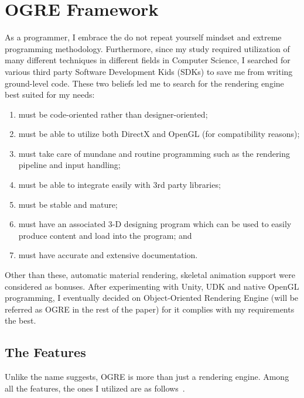\appendix
\chapter{OGRE Framework}
\label{appendix_ogre_framework}

As a programmer, I embrace the do not repeat yourself mindset and extreme programming methodology. Furthermore, since my study required utilization of many different techniques in different fields in Computer Science, I searched for various third party Software Development Kids (SDKs) to save me from writing ground-level code. These two beliefs led me to search for the rendering engine best suited for my needs:

\begin{enumerate}
\item must be code-oriented rather than designer-oriented;
\item must be able to utilize both DirectX and OpenGL (for compatibility reasons);
\item must take care of mundane and routine programming such as the rendering pipeline and input handling;
\item must be able to integrate easily with 3rd party libraries;
\item must be stable and mature;
\item must have an associated 3-D designing program which can be used to easily produce content and load into the program; and
\item must have accurate and extensive documentation.
\end{enumerate}

Other than these, automatic material rendering, skeletal animation support were considered as bonuses.
After experimenting with Unity, UDK and native OpenGL programming, I eventually decided on Object-Oriented Rendering Engine (will be referred as OGRE in the rest of the paper) for it complies with my requirements the best.


\section{The Features}
Unlike the name suggests, OGRE is more than just a rendering engine. Among all the features, the ones I utilized are as follows~\cite{Knot2012}.

